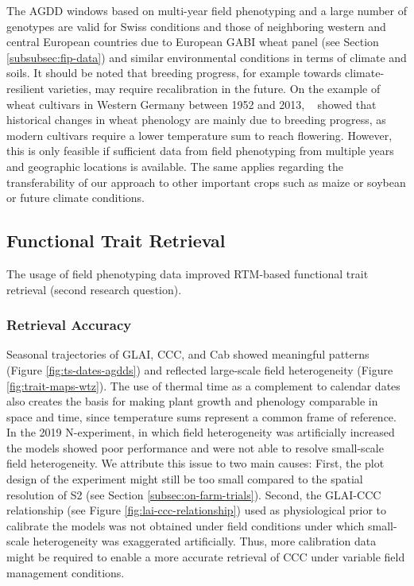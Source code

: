 The AGDD windows based on multi-year field phenotyping and a large number of genotypes are valid for Swiss conditions and those of neighboring western and central European countries due to European GABI wheat panel (see Section \ref{subsubsec:fip-data}) and similar environmental conditions in terms of climate and soils. It should be noted that breeding progress, for example towards climate-resilient varieties, may require recalibration in the future. On the example of wheat cultivars in Western Germany between 1952 and 2013, ~\cite{rezaei_climate_2018} showed that historical changes in wheat phenology are mainly due to breeding progress, as modern cultivars require a lower temperature sum to reach flowering. However, this is only feasible if sufficient data from field phenotyping from multiple years and geographic locations is available. The same applies regarding the transferability of our approach to other important crops such as maize or soybean or future climate conditions.

\subsection{Functional Trait Retrieval}
The usage of field phenotyping data improved RTM-based functional trait retrieval (second research question). 

\subsubsection{Retrieval Accuracy}
Seasonal trajectories of GLAI, CCC, and \gls{Cab} showed meaningful patterns (Figure \ref{fig:ts-dates-agdds}) and reflected large-scale field heterogeneity (Figure \ref{fig:trait-maps-wtz}). The use of thermal time as a complement to calendar dates also creates the basis for making plant growth and phenology comparable in space and time, since temperature sums represent a common frame of reference. In the 2019 N-experiment, in which field heterogeneity was artificially increased the models showed poor performance and were not able to resolve small-scale field heterogeneity. We attribute this issue to two main causes: First, the plot design of the experiment might still be too small compared to the spatial resolution of \gls{S2} (see Section \ref{subsec:on-farm-trials}). Second, the GLAI-CCC relationship (see Figure \ref{fig:lai-ccc-relationship}) used as physiological prior to calibrate the models was not obtained under field conditions under which small-scale heterogeneity was exaggerated artificially. Thus, more calibration data might be required to enable a more accurate retrieval of \gls{CCC} under variable field management conditions.

